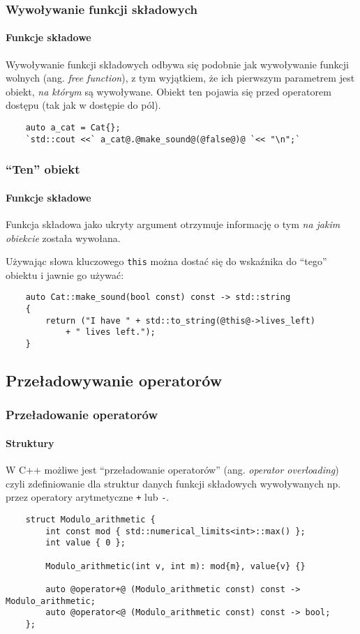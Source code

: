\documentclass[aspectratio=169,10pt]{beamer}
\begin{document}
\begin{frame}[fragile]
    \frametitle{Wywoływanie funkcji składowych}
    \framesubtitle{Funkcje składowe}

    Wywoływanie funkcji składowych odbywa się podobnie jak wywoływanie funkcji
    wolnych (ang. \emph{free function}), z tym wyjątkiem, że ich pierwszym
    parametrem jest obiekt, \emph{na którym} są wywoływane. Obiekt ten pojawia
    się przed operatorem dostępu (tak jak w dostępie do pól).

    {\small
    \begin{lstlisting}
    auto a_cat = Cat{};
    `std::cout <<` a_cat@.@make_sound@(@false@)@ `<< "\n";`
    \end{lstlisting}}
\end{frame}

\begin{frame}[fragile]
    \frametitle{``Ten'' obiekt}
    \framesubtitle{Funkcje składowe}

    Funkcja składowa jako ukryty argument otrzymuje informację o tym \emph{na
    jakim obiekcie} została wywołana.

    \vspace{1em}

    Używając słowa kluczowego \texttt{this} można dostać się do wskaźnika do
    ``tego'' obiektu i jawnie go używać:

    {\small
    \begin{lstlisting}
    auto Cat::make_sound(bool const) const -> std::string
    {
        return ("I have " + std::to_string(@this@->lives_left)
            + " lives left.");
    }
    \end{lstlisting}}
\end{frame}

\subsection{Przeładowywanie operatorów}

\begin{frame}[fragile]
    \frametitle{Przeładowanie operatorów}
    \framesubtitle{Struktury}
    \label{overloaded_operator_example}

    W C++ możliwe jest ``przeładowanie operatorów'' (ang. \emph{operator
    overloading}) czyli zdefiniowanie dla struktur danych funkcji składowych
    wywoływanych np. przez operatory arytmetyczne \texttt{+} lub \texttt{-}.

    {\scriptsize
    \begin{lstlisting}
    struct Modulo_arithmetic {
        int const mod { std::numerical_limits<int>::max() };
        int value { 0 };

        Modulo_arithmetic(int v, int m): mod{m}, value{v} {}

        auto @operator+@ (Modulo_arithmetic const) const -> Modulo_arithmetic;
        auto @operator<@ (Modulo_arithmetic const) const -> bool;
    };
    \end{lstlisting}}
\end{frame}
\end{document}
